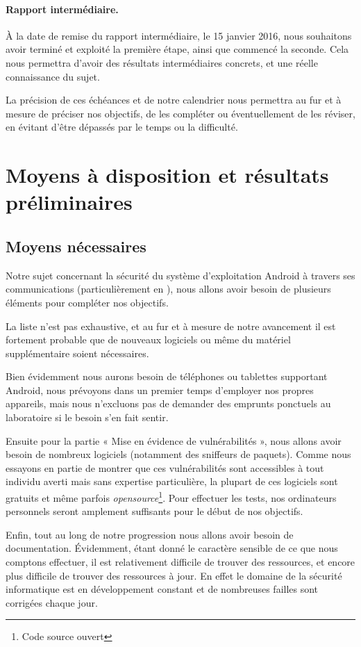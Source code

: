 \documentclass[a4paper, 12pt,twoside]{article}
\begin{document}
		\paragraph{Rapport intermédiaire. } À la date de remise du rapport intermédiaire, le 15 janvier 2016, nous souhaitons avoir terminé et exploité la première étape, ainsi que commencé la seconde. Cela nous permettra d'avoir des résultats intermédiaires concrets, et une réelle connaissance du sujet.
		
		La précision de ces échéances et de notre calendrier nous permettra au fur et à mesure de préciser nos objectifs, de les compléter ou éventuellement de les réviser, en évitant d'être dépassés par le temps ou la difficulté.
			
	\section{Moyens à disposition et résultats préliminaires}
	
		\subsection{Moyens nécessaires}

		Notre sujet concernant la sécurité du système d'exploitation Android à travers ses communications (particulièrement en \wifi{}), nous allons avoir besoin de plusieurs éléments pour compléter nos objectifs.
		
		La liste n'est pas exhaustive, et au fur et à mesure de notre avancement il est fortement probable que de nouveaux logiciels ou même du matériel supplémentaire soient nécessaires.
		
		Bien évidemment nous aurons besoin de téléphones ou tablettes supportant Android, nous prévoyons dans un premier temps d'employer nos propres appareils, mais nous n'excluons pas de demander des emprunts ponctuels au laboratoire si le besoin s'en fait sentir.
		
		Ensuite pour la partie « Mise en évidence de vulnérabilités », nous allons avoir besoin de nombreux logiciels (notamment des sniffeurs de paquets). Comme nous essayons en partie de montrer que ces vulnérabilités sont accessibles à tout individu averti mais sans expertise particulière, la plupart de ces logiciels sont gratuits et même parfois \emph{opensource}\footnote{Code source ouvert}. Pour effectuer les tests, nos ordinateurs personnels seront amplement suffisants pour le début de nos objectifs.
		
		Enfin, tout au long de notre progression nous allons avoir besoin de documentation. Évidemment, étant donné le caractère sensible de ce que nous comptons effectuer, il est relativement difficile de trouver des ressources, et encore plus difficile de trouver des ressources à jour. En effet le domaine de la sécurité informatique est en développement constant et de nombreuses failles sont corrigées chaque jour.
\end{document}
